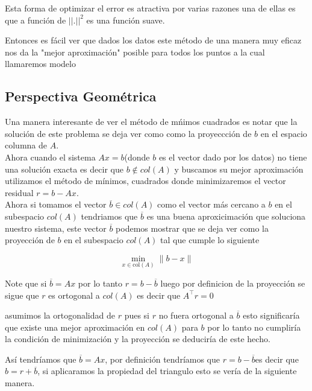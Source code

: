 \documentclass[12pt]{article}
\begin{document}
Esta forma de optimizar el error es atractiva por varias razones una de ellas es que a funci\'on de $||.||^2$ es una funci\'on suave.

Entonces es f\'acil ver que dados los datos este m\'etodo de una manera muy eficaz nos da la "mejor aproximaci\'on" posible para todos los puntos a la cual llamaremos modelo
\vspace{0.7cm}



\begin{center}
    \section{Perspectiva Geom\'etrica}
\end{center}
\vspace{0.7cm}
Una manera interesante de ver el m\'etodo de m\'nimos cuadrados es notar que la soluci\'on de este problema se deja ver como como la proyeccci\'on  de $b$ en el espacio columna de $A$.\\

Ahora cuando el sistema $Ax=b$(donde $b$ es el vector dado por los datos) no tiene una soluci\'on exacta es decir que $b\notin col(A)$ y buscamos su mejor aproximaci\'on
utilizamos el m\'etodo de m\'inimos, cuadrados donde
minimizaremos el vector residual $r=b-Ax$.\\

Ahora si tomamos el vector $\overline{b}\in col(A)$ como el vector m\'as cercano a $b$ en el subespacio $col(A)$  tendriamos que $\overline{b}$ es una buena aproxicimaci\'on que soluciona nuestro sistema, este vector $\overline{b}$ podemos mostrar que se deja ver como la proyecci\'on  de $b$ en el subespacio $col(A)$  tal que cumple lo siguiente 

\[
\min_{x \in \text{col}(A)} \| b - x \|
\]

Note que si $\overline{b}=Ax$ por lo tanto $r=b-\overline{b}$ luego por definicion de la proyecci\'on  se sigue que $r$ es ortogonal a $col(A)$ es decir que $A^\top r=0$ 

asumimos la ortogonalidad de $r$ pues si $r$ no fuera ortogonal a $\overline{b}$ esto significar\'ia que existe una mejor aproximaci\'on en $col(A)$ para $b$ por lo tanto no cumplir\'ia la condici\'on de minimizaci\'on y la proyecci\'on se deducir\'ia  de este hecho.

As\'i tendr\'iamos que $\overline{b}=Ax$, por definici\'on tendr\'iamos que $r=b-\overline{b}$es decir que $b=r+\overline{b}$, si aplicaramos la propiedad del triangulo esto se ver\'ia de la siguiente manera.
\end{document}
